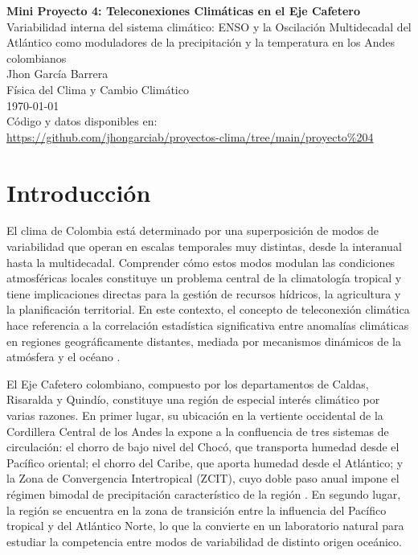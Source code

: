\documentclass[12pt, a4paper]{article}
\begin{document}
	
	\begin{titlepage}
		\centering
		\vspace*{2cm}
		{\LARGE \textbf{Mini Proyecto 4: Teleconexiones Climáticas en el Eje Cafetero}\\[0.5em]
			\large Variabilidad interna del sistema climático: ENSO y la Oscilación
			Multidecadal del Atlántico como moduladores de la precipitación
			y la temperatura en los Andes colombianos}\\[2cm]
		{\large Jhon García Barrera}\\[0.5em]
		{\normalsize Física del Clima y Cambio Climático}\\[0.5em]
		{\normalsize \today}\\[3cm]
		\vfill
		{\small Código y datos disponibles en:\\
			\url{https://github.com/jhongarciab/proyectos-clima/tree/main/proyecto%204}}
	\end{titlepage}
	
	\tableofcontents
	\newpage

\section{Introducción}

El clima de Colombia está determinado por una superposición de modos de variabilidad
que operan en escalas temporales muy distintas, desde la interanual hasta la
multidecadal. Comprender cómo estos modos modulan las condiciones atmosféricas locales
constituye un problema central de la climatología tropical y tiene implicaciones directas
para la gestión de recursos hídricos, la agricultura y la planificación territorial.
En este contexto, el concepto de teleconexión climática hace referencia a la
correlación estadística significativa entre anomalías climáticas en regiones geográficamente
distantes, mediada por mecanismos dinámicos de la atmósfera y el océano
\citep{Poveda1997}.

El Eje Cafetero colombiano, compuesto por los departamentos de Caldas, Risaralda y
Quindío, constituye una región de especial interés climático por varias razones.
En primer lugar, su ubicación en la vertiente occidental de la Cordillera Central de
los Andes la expone a la confluencia de tres sistemas de circulación: el chorro de
bajo nivel del Chocó, que transporta humedad desde el Pacífico oriental; el chorro
del Caribe, que aporta humedad desde el Atlántico; y la Zona de Convergencia
Intertropical (ZCIT), cuyo doble paso anual impone el régimen bimodal de
precipitación característico de la región \citep{Hoyos2018}. En segundo lugar,
la región se encuentra en la zona de transición entre la influencia del Pacífico
tropical y del Atlántico Norte, lo que la convierte en un laboratorio natural para
estudiar la competencia entre modos de variabilidad de distinto origen oceánico.
\end{document}
